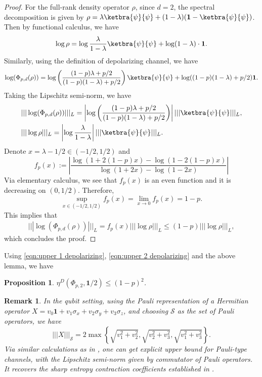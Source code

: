 \documentclass[11pt,reqno]{amsart}
\numberwithin{equation}{section}
\newtheorem{prop}[lemma]{Proposition}
\newtheorem{remark}[lemma]{Remark}
\newcommand{\mc}{\mathcal}
\begin{document}
\begin{proof}
For the full-rank density operator $\rho$, since $d = 2$, the spectral decomposition is given by $\rho = \lambda \ketbra{\psi}{\psi} + (1-\lambda)(\textbf{1} - \ketbra{\psi}{\psi})$. Then by functional calculus, we have
\begin{align*}
    \log \rho = \log \frac{\lambda}{1 - \lambda} \ketbra{\psi}{\psi} + \log(1-\lambda) \cdot\textbf{1}.
\end{align*}
Similarly, using the definition of depolarizing channel, we have 
\begin{align*}
    \log(\Phi_{p,d}(\rho)) = \log \left(\frac{(1-p)\lambda + p/2}{(1-p)(1-\lambda) + p/2}\right) \ketbra{\psi}{\psi} + \log( (1-p)(1-\lambda) + p/2) \textbf{1}.
\end{align*}
Taking the Lipschitz semi-norm, we have 
\begin{align*}
   & |||\log(\Phi_{p,d}(\rho))|||_L = \left| \log \left(\frac{(1-p)\lambda + p/2}{(1-p)(1-\lambda) + p/2}\right) \right| |||\ketbra{\psi}{\psi}|||_L, \\
   & |||\log \rho|||_L = \left| \log \frac{\lambda}{1 - \lambda} \right| |||\ketbra{\psi}{\psi}|||_L.
\end{align*}
Denote $x = \lambda - 1/2 \in (-1/2, 1/2)$ and 
\begin{equation}
    f_p(x):= \left| \frac{\log (1+2(1-p)x) - \log (1-2(1-p)x)}{\log(1+2x) - \log(1-2x)} \right|
\end{equation}
Via elementary calculus, we see that $f_p(x)$ is an even function and it is decreasing on $(0,1/2)$. Therefore,
\begin{equation}
   \sup_{x \in (-1/2,1/2)} f_p(x) = \lim_{x \to 0}f_p(x) = 1-p.
\end{equation}
This implies that \begin{align*}
    |||\log(\Phi_{p,d}(\rho))|||_L = f_p(x) |||\log \rho|||_L \le (1-p)|||\log \rho|||_L,
\end{align*}
which concludes the proof.
\end{proof}
Using \eqref{eqn:upper 1 depolarizing}, \eqref{eqn:upper 2 depolarizing} and the above lemma, we have
\begin{prop}
    $\eta^D(\Phi_{p,2},\textbf{1}/2) \le (1-p)^2$.
\end{prop}

\begin{remark}
In the qubit setting, using the Pauli representation of a Hermitian operator $X = v_0\textbf{1} + v_1 \sigma_x + v_2 \sigma_y + v_3 \sigma_z$, and choosing $\mc S$ as the set of Pauli operators, we have
    \begin{equation}
    |||X|||_{\mc S} = 2\max\left\{ \sqrt{v_1^2 + v_2^2}, \sqrt{v_2^2 + v_3^2}, \sqrt{v_1^2 + v_3^2} \right\}.
\end{equation}
Via similar calculations as in \cite{belzig2024}, one can get explicit upper bound for Pauli-type channels, with the Lipschitz semi-norm given by commutator of Pauli operators. It recovers the sharp entropy contraction coefficients established in \cite{hiai2016contraction}. 
\end{remark}
\end{document}
